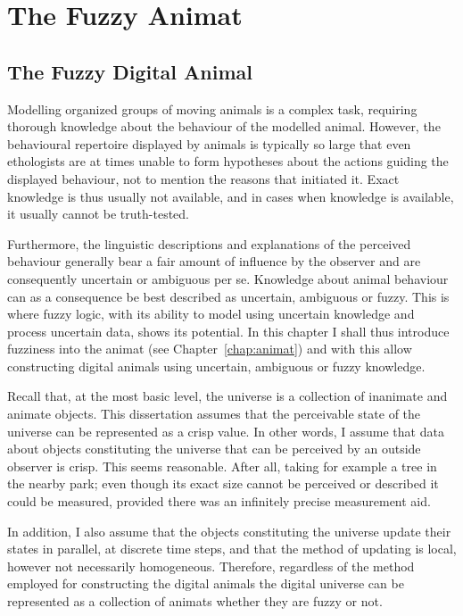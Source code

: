\graphicspath{{img/}}





\chapter{The Fuzzy Animat}
\label{chap:fuzzyAnimat}


\section{The Fuzzy Digital Animal}
\label{sec:fuzzyAnimat}
Modelling organized groups of moving animals is a complex task, requiring thorough knowledge about the behaviour of the modelled animal. However, the behavioural repertoire displayed by animals is typically so large that even ethologists are at times unable to form hypotheses about the actions guiding the displayed behaviour, not to mention the reasons that initiated it. Exact knowledge is thus usually not available, and in cases when knowledge is available, it usually cannot be truth-tested. 

Furthermore, the linguistic descriptions and explanations of the perceived behaviour generally bear a fair amount of influence by the observer and are consequently uncertain or ambiguous per se. Knowledge about animal behaviour can as a consequence be best described as uncertain, ambiguous or fuzzy. This is where fuzzy logic, with its ability to model using uncertain knowledge and process uncertain data, shows its potential. In this chapter I shall thus introduce fuzziness into the animat (see Chapter~\ref{chap:animat}) and with this allow constructing digital animals using uncertain, ambiguous or fuzzy knowledge. 

Recall that, at the most basic level, the universe is a collection of inanimate and animate objects. This dissertation assumes that the perceivable state of the universe can be represented as a crisp value. In other words, I assume that data about objects constituting the universe that can be perceived by an outside observer is crisp. This seems reasonable. After all, taking for example a tree in the nearby park; even though its exact size cannot be perceived or described it could be measured, provided there was an infinitely precise measurement aid.

In addition, I also assume that the objects constituting the universe update their states in parallel, at discrete time steps, and that the method of updating is local, however not necessarily homogeneous. Therefore, regardless of the method employed for constructing the digital animals the digital universe can be represented as a collection of animats whether they are fuzzy or not.


